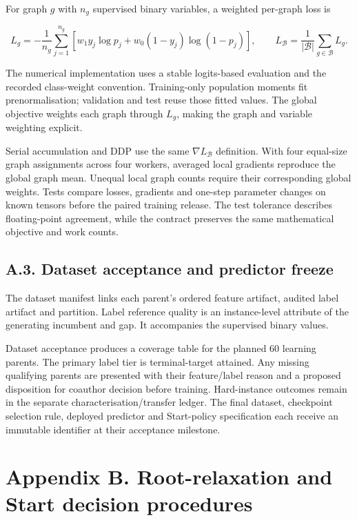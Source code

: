 \documentclass[
  british,
  10pt,
]{article}
\begin{document}
For graph \(g\) with \(n_g\) supervised binary variables, a weighted
per-graph loss is

\[
L_g=-\frac{1}{n_g}\sum_{j=1}^{n_g}
\left[w_1y_j\log p_j+w_0(1-y_j)\log(1-p_j)\right],
\qquad L_{\mathcal B}=\frac{1}{|\mathcal B|}\sum_{g\in\mathcal B}L_g.
\tag{A.2}
\]

The numerical implementation uses a stable logits-based evaluation and
the recorded class-weight convention. Training-only population moments
fit prenormalisation; validation and test reuse those fitted values. The
global objective weights each graph through \(L_g\), making the graph
and variable weighting explicit.

Serial accumulation and DDP use the same \(\nabla L_{\mathcal B}\)
definition. With four equal-size graph assignments across four workers,
averaged local gradients reproduce the global graph mean. Unequal local
graph counts require their corresponding global weights. Tests compare
losses, gradients and one-step parameter changes on known tensors before
the paired training release. The test tolerance describes floating-point
agreement, while the contract preserves the same mathematical objective
and work counts.

\subsection{A.3. Dataset acceptance and predictor
freeze}\label{a.3.-dataset-acceptance-and-predictor-freeze}

The dataset manifest links each parent's ordered feature artifact,
audited label artifact and partition. Label reference quality is an
instance-level attribute of the generating incumbent and gap. It
accompanies the supervised binary values.

Dataset acceptance produces a coverage table for the planned 60 learning
parents. The primary label tier is terminal-target attained. Any missing
qualifying parents are presented with their feature/label reason and a
proposed disposition for coauthor decision before training.
Hard-instance outcomes remain in the separate characterisation/transfer
ledger. The final dataset, checkpoint selection rule, deployed predictor
and Start-policy specification each receive an immutable identifier at
their acceptance milestone.

\section{Appendix B. Root-relaxation and Start decision
procedures}\label{appendix-b.-root-relaxation-and-start-decision-procedures}
\end{document}
